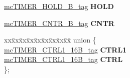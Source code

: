\begin{DoxyCompactItemize}
\mbox{\hyperlink{unionmcTIMER__HOLD__16B__tag}{mc\+T\+I\+M\+E\+R\+\_\+\+H\+O\+L\+D\+\_\+B\+\_\+tag}} {\bfseries H\+O\+LD}
\item 
\mbox{\label{structmcTIMER__CHANNEL__struct__tag_a593f693feeb9659ecab6640aa0c6bffa}} 
\mbox{\hyperlink{unionmcTIMER__CNTR__16B__tag}{mc\+T\+I\+M\+E\+R\+\_\+\+C\+N\+T\+R\+\_\+B\+\_\+tag}} {\bfseries C\+N\+TR}
\item 
\mbox{\label{structmcTIMER__CHANNEL__struct__tag_ac194e8701eb37e5ab8bc5c586dcb7ee8}} 
\begin{tabbing}
xx\=xx\=xx\=xx\=xx\=xx\=xx\=xx\=xx\=\kill
union \{\\
\>\mbox{\hyperlink{unionmcTIMER__CTRL1__16B__tag}{mcTIMER\_CTRL1\_16B\_tag}} {\bfseries CTRL1}\\
\>\mbox{\hyperlink{unionmcTIMER__CTRL1__16B__tag}{mcTIMER\_CTRL1\_16B\_tag}} {\bfseries CTRL}\\
\}; \\


\end{tabbing}
\end{DoxyCompactItemize}
